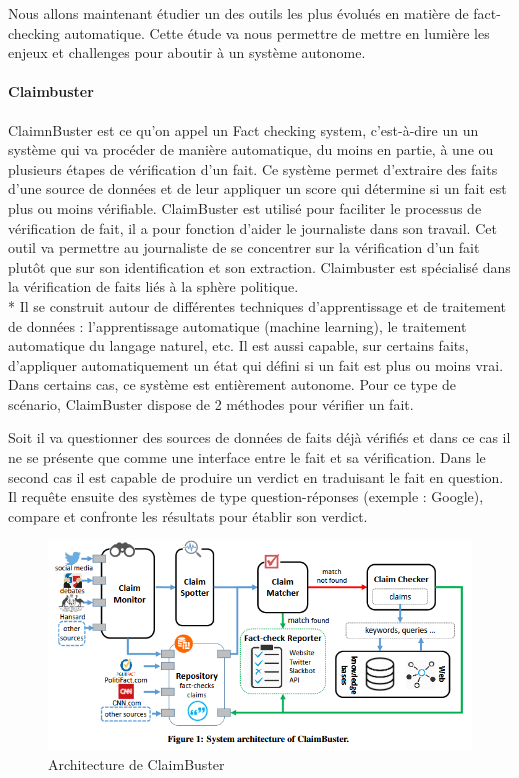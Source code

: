Nous allons maintenant étudier un des outils les plus évolués en matière de fact-checking automatique. Cette étude va nous permettre de mettre en lumière les enjeux et challenges pour aboutir à un système autonome.

\paragraph{Claimbuster} \cite{hassan2017claimbuster} \cite{hassan2015quest}

ClaimnBuster est ce qu'on appel un Fact checking system, c'est-à-dire un un système qui va procéder de manière automatique, du moins en partie, à une ou plusieurs étapes de vérification d'un fait. Ce système permet d'extraire des faits d'une source de données et de leur appliquer un score qui détermine si un fait est plus ou moins vérifiable. ClaimBuster est utilisé pour faciliter le processus de vérification de fait, il a pour fonction d'aider le journaliste dans son travail. Cet outil va permettre au journaliste de se concentrer sur la vérification d'un fait plutôt que sur son identification et son extraction. Claimbuster est spécialisé dans la vérification de faits liés à la sphère politique.
\\*
Il se construit autour de différentes techniques d'apprentissage et de traitement de données : l'apprentissage automatique (machine learning), le traitement automatique du langage naturel, etc.
Il est aussi capable, sur certains faits, d'appliquer automatiquement un état qui défini si un fait est plus ou moins vrai. Dans certains cas, ce système est entièrement autonome. Pour ce type de scénario, ClaimBuster dispose de 2 méthodes pour vérifier un fait. 

Soit il va questionner des sources de données de faits déjà vérifiés et dans ce cas il ne se présente que comme une interface entre le fait et sa vérification. Dans le second cas il est capable de produire un verdict en traduisant le fait en question. Il requête ensuite des systèmes de type question-réponses (exemple : Google), compare et confronte les résultats pour établir son verdict.

\begin{figure}[ht]
\centering
\includegraphics[width=\textwidth, draft=false]{imgs/claimbuster.PNG}
\caption{Architecture de ClaimBuster}
\label{claimbuster}
\end{figure}

